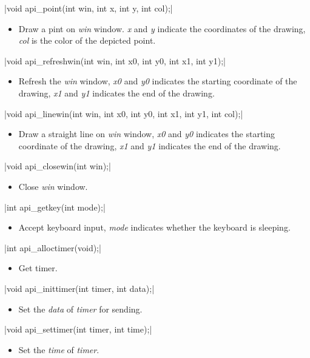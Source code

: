 \documentclass{swfcthesis}
\begin{document}
\csingle|void api_point(int win, int x, int y, int col);|
\begin{itemize}
\item Draw a pint on \emph{win} window. \emph{x} and \emph{y} indicate the coordinates of
  the drawing, \emph{col} is the color of the depicted point.
  
\end{itemize}

\csingle|void api_refreshwin(int win, int x0, int y0, int x1, int y1);|
\begin{itemize}
\item Refresh the \emph{win} window, \emph{x0} and \emph{y0} indicates the starting
  coordinate of the drawing, \emph{x1} and \emph{y1} indicates the end of the drawing.
    
\end{itemize}

\csingle|void api_linewin(int win, int x0, int y0, int x1, int y1, int col);|
\begin{itemize}
\item Draw a straight line on \emph{win} window, \emph{x0} and \emph{y0} indicates the
  starting coordinate of the drawing, \emph{x1} and \emph{y1} indicates the end of the
  drawing.
  
\end{itemize}

\csingle|void api_closewin(int win);|
\begin{itemize}
\item Close \emph{win} window.
\end{itemize}

\csingle|int api_getkey(int mode);|
\begin{itemize}
\item Accept keyboard input, \emph{mode} indicates whether the keyboard is sleeping.
\end{itemize}

\csingle|int api_alloctimer(void);|
\begin{itemize}
\item Get timer.
\end{itemize}

\csingle|void api_inittimer(int timer, int data);|
\begin{itemize}
\item Set the \emph{data} of \emph{timer} for sending.
\end{itemize}

\csingle|void api_settimer(int timer, int time);|
\begin{itemize}
\item Set the \emph{time} of \emph{timer}.
\end{itemize}
\end{document}
